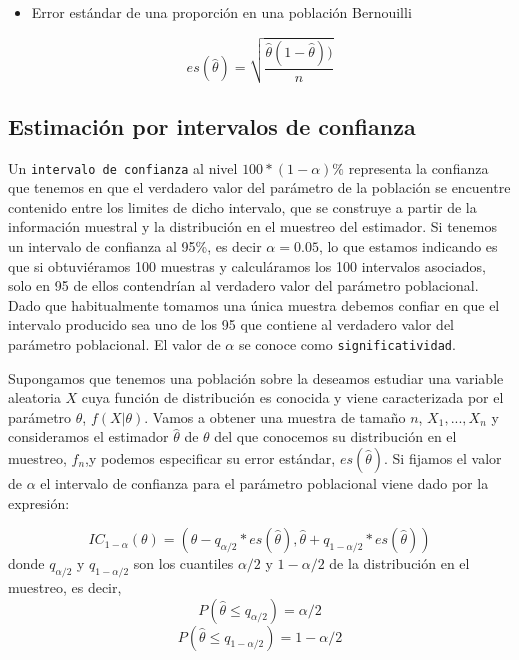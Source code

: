 \documentclass[
]{book}
\providecommand{\tightlist}{%
  \setlength{\itemsep}{0pt}\setlength{\parskip}{0pt}}
\begin{document}
\begin{itemize}
\tightlist
\item
  Error estándar de una proporción en una población Bernouilli
\end{itemize}

\[es(\hat{\theta}) = \sqrt{\frac{\hat{\theta} (1-\hat{\theta}))}{n}}\]

\hypertarget{estimaciuxf3n-por-intervalos-de-confianza}{%
\subsection{Estimación por intervalos de confianza}\label{estimaciuxf3n-por-intervalos-de-confianza}}

Un \texttt{intervalo\ de\ confianza} al nivel \(100*(1 - \alpha)\%\) representa la confianza que tenemos en que el verdadero valor del parámetro de la población se encuentre contenido entre los limites de dicho intervalo, que se construye a partir de la información muestral y la distribución en el muestreo del estimador. Si tenemos un intervalo de confianza al 95\%, es decir \(\alpha = 0.05\), lo que estamos indicando es que si obtuviéramos 100 muestras y calculáramos los 100 intervalos asociados, solo en 95 de ellos contendrían al verdadero valor del parámetro poblacional. Dado que habitualmente tomamos una única muestra debemos confiar en que el intervalo producido sea uno de los 95 que contiene al verdadero valor del parámetro poblacional. El valor de \(\alpha\) se conoce como \texttt{significatividad}.

Supongamos que tenemos una población sobre la deseamos estudiar una variable aleatoria \(X\) cuya función de distribución es conocida y viene caracterizada por el parámetro \(\theta\), \(f(X|\theta)\). Vamos a obtener una muestra de tamaño \(n\), \(X_1,...,X_n\) y consideramos el estimador \(\hat\theta\) de \(\theta\) del que conocemos su distribución en el muestreo, \(f_n\),y podemos especificar su error estándar, \(es(\hat{\theta})\). Si fijamos el valor de \(\alpha\) el intervalo de confianza para el parámetro poblacional viene dado por la expresión:

\[IC_{1-\alpha}(\theta) = (\hat{\theta} - q_{\alpha/2}*es(\hat{\theta}),\hat{\theta} + q_{1-\alpha/2}*es(\hat{\theta}))\] donde \(q_{\alpha/2}\) y \(q_{1-\alpha/2}\) son los cuantiles \(\alpha/2\) y \(1-\alpha/2\) de la distribución en el muestreo, es decir, \[P(\hat{\theta} \leq q_{\alpha/2}) = \alpha/2\] \[P(\hat{\theta} \leq q_{1-\alpha/2}) = 1-\alpha/2\]
\end{document}
